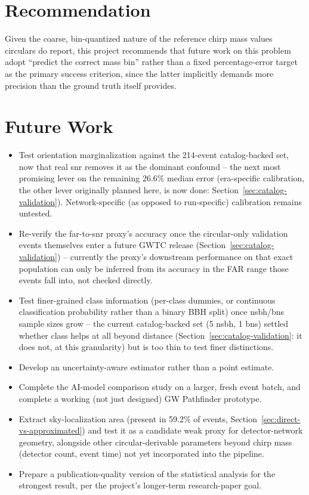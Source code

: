 \section{Recommendation}

Given the coarse, bin-quantized nature of the reference chirp mass values circulars do report, this project recommends that future work on this problem adopt ``predict the correct mass bin'' rather than a fixed percentage-error target as the primary success criterion, since the latter implicitly demands more precision than the ground truth itself provides.

\section{Future Work}

\begin{itemize}
    \item Test orientation marginalization against the 214-event catalog-backed set, now that real \gls{snr} removes it as the dominant confound -- the next most promising lever on the remaining 26.6\% median error (era-specific calibration, the other lever originally planned here, is now done: Section~\ref{sec:catalog-validation}). Network-specific (as opposed to run-specific) calibration remains untested.
    \item Re-verify the \gls{far}-to-\gls{snr} proxy's accuracy once the circular-only validation events themselves enter a future GWTC release (Section~\ref{sec:catalog-validation}) -- currently the proxy's downstream performance on that exact population can only be inferred from its accuracy in the FAR range those events fall into, not checked directly.
    \item Test finer-grained class information (per-class dummies, or continuous classification probability rather than a binary BBH split) once \gls{nsbh}/\gls{bns} sample sizes grow -- the current catalog-backed set (5 \gls{nsbh}, 1 \gls{bns}) settled whether class helps at all beyond distance (Section~\ref{sec:catalog-validation}: it does not, at this granularity) but is too thin to test finer distinctions.
    \item Develop an uncertainty-aware estimator rather than a point estimate.
    \item Complete the AI-model comparison study on a larger, fresh event batch, and complete a working (not just designed) GW Pathfinder prototype.
    \item Extract sky-localization area (present in 59.2\% of events, Section~\ref{sec:direct-vs-approximated}) and test it as a candidate weak proxy for detector-network geometry, alongside other circular-derivable parameters beyond chirp mass (detector count, event time) not yet incorporated into the pipeline.
    \item Prepare a publication-quality version of the statistical analysis for the strongest result, per the project's longer-term research-paper goal.
\end{itemize}
